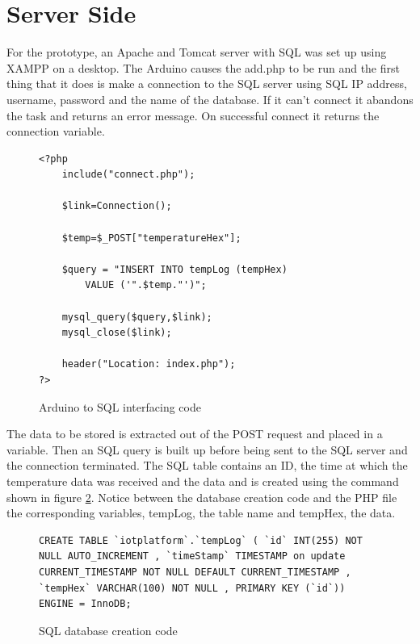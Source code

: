 \section{Server Side}

For the prototype, an Apache and Tomcat server with SQL was set up using XAMPP on a desktop. The Arduino causes the add.php to be run and the first thing that it does is make a connection to the SQL server using SQL IP address, username, password and the name of the database. If it can't connect it abandons the task and returns an error message. On successful connect it returns the connection variable.

\begin{figure}[H]
\begin{lstlisting}[style=PHP]
<?php
   	include("connect.php");
 
   	$link=Connection();
	
	$temp=$_POST["temperatureHex"];
 
	$query = "INSERT INTO tempLog (tempHex) 
		VALUE ('".$temp."')"; 
 
   	mysql_query($query,$link);
   	mysql_close($link);
 
   	header("Location: index.php");
?>
\end{lstlisting}
\caption{Arduino to SQL interfacing code}
\label{snip:php}
\end{figure}

The data to be stored is extracted out of the POST request and placed in a variable. Then an SQL query is built up before being sent to the SQL server and the connection terminated. The SQL table contains an ID, the time at which the temperature data was received and the data and is created using the command shown in figure \ref{snip:sql}. Notice between the database creation code and the PHP file the corresponding variables, tempLog, the table name and tempHex, the data.

\begin{figure}[H]
\begin{lstlisting}[style=SQL]
CREATE TABLE `iotplatform`.`tempLog` ( `id` INT(255) NOT NULL AUTO_INCREMENT , `timeStamp` TIMESTAMP on update CURRENT_TIMESTAMP NOT NULL DEFAULT CURRENT_TIMESTAMP , `tempHex` VARCHAR(100) NOT NULL , PRIMARY KEY (`id`)) ENGINE = InnoDB;
\end{lstlisting}
\caption{SQL database creation code}
\label{snip:sql}
\end{figure}

